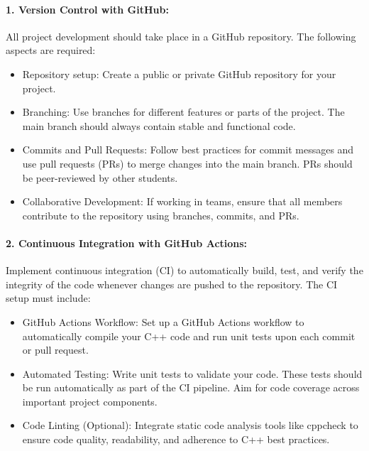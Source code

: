 \documentclass[english,10pt,a4paper]{article}
\begin{document}
\paragraph{1. Version Control with GitHub:}
All project development should take place in a GitHub repository. The following aspects are required:
\begin{itemize}
\item Repository setup: Create a public or private GitHub repository for your project.
\item Branching: Use branches for different features or parts of the project. The main branch should always contain stable and functional code.
\item Commits and Pull Requests: Follow best practices for commit messages and use pull requests (PRs) to merge changes into the main branch. PRs should be peer-reviewed by other students.
\item Collaborative Development: If working in teams, ensure that all members contribute to the repository using branches, commits, and PRs.
\end{itemize}

\paragraph{2. Continuous Integration with GitHub Actions:}
Implement continuous integration (CI) to automatically build, test, and verify the integrity of the code whenever changes are pushed to the repository. The CI setup must include:
\begin{itemize}
\item GitHub Actions Workflow: Set up a GitHub Actions workflow to automatically compile your C++ code and run unit tests upon each commit or pull request.
\item Automated Testing: Write unit tests to validate your code. These tests should be run automatically as part of the CI pipeline. Aim for code coverage across important project components.
\item Code Linting (Optional): Integrate static code analysis tools like cppcheck to ensure code quality, readability, and adherence to C++ best practices.
\end{itemize}
\end{document}
